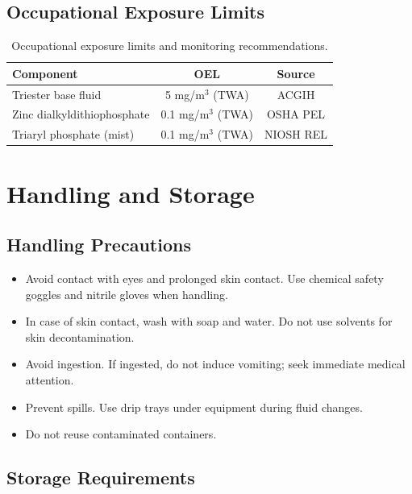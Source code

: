 \documentclass[
    language=english,
    doctype=data-sheet,
    institution=none,
]{../../omnilatex}
\begin{document}
\subsection{Occupational Exposure Limits}

\begin{table}[htbp]
    \centering
    \caption{Occupational exposure limits and monitoring recommendations.}
    \label{tab:exposure}
    \begin{tabular}{@{}lcc@{}}
        \toprule
        Component & OEL & Source \\
        \midrule
        Triester base fluid & 5 mg/m$^3$ (TWA) & ACGIH \\
        Zinc dialkyldithiophosphate & 0.1 mg/m$^3$ (TWA) & OSHA PEL \\
        Triaryl phosphate (mist) & 0.1 mg/m$^3$ (TWA) & NIOSH REL \\
        \bottomrule
    \end{tabular}
\end{table}

\section{Handling and Storage}
\label{sec:handling}

\subsection{Handling Precautions}

\begin{itemize}
    \item Avoid contact with eyes and prolonged skin contact. Use chemical
          safety goggles and nitrile gloves when handling.
    \item In case of skin contact, wash with soap and water. Do not use
          solvents for skin decontamination.
    \item Avoid ingestion. If ingested, do not induce vomiting; seek
          immediate medical attention.
    \item Prevent spills. Use drip trays under equipment during
          fluid changes.
    \item Do not reuse contaminated containers.
\end{itemize}

\subsection{Storage Requirements}
\end{document}
